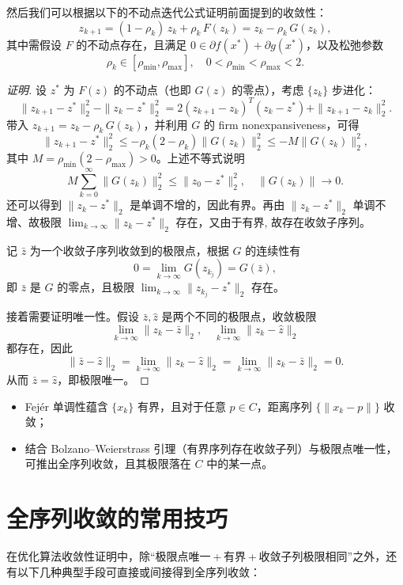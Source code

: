 然后我们可以根据以下的不动点迭代公式证明前面提到的收敛性：
\[
z_{k+1} = (1-\rho_k)\,z_k + \rho_k\,F(z_k)
= z_k - \rho_k\,G(z_k),
\]
其中需假设 $F$ 的不动点存在，且满足 $0\in \partial f(x^*)+\partial g(x^*)$，以及松弛参数
\[
\rho_k\in [\rho_{\min},\rho_{\max}],\quad
0<\rho_{\min}<\rho_{\max}<2.
\]

\begin{proof}[证明]
	设 $z^*$ 为 $F(z)$ 的不动点（也即 $G(z)$ 的零点），考虑 $\{z_k\}$ 步进化：
	\[
	\|z_{k+1}-z^*\|_2^2 - \|z_k-z^*\|_2^2
	= 2(z_{k+1}-z_k)^T(z_k-z^*) + \|z_{k+1}-z_k\|_2^2.
	\]
	带入 $z_{k+1}=z_k-\rho_k\,G(z_k)$，并利用 $G$ 的 firm nonexpansiveness，可得
	\[
	\|z_{k+1}-z^*\|_2^2
	\le -\rho_k(2-\rho_k)\|G(z_k)\|_2^2
	\le -M\|G(z_k)\|_2^2,
	\]
	其中 $M = \rho_{\min}(2-\rho_{\max})>0$。上述不等式说明
	\[
	M\sum_{k=0}^\infty \|G(z_k)\|_2^2 \le \|z_0-z^*\|_2^2,\quad
	\|G(z_k)\|\to 0.
	\]
	还可以得到 $\|z_k - z^*\|_2$ 是单调不增的，因此有界。再由 $\|z_k - z^*\|_2$ 单调不增、故极限 $\lim_{k\to\infty}\|z_k-z^*\|_2$ 存在，又由于有界, 故存在收敛子序列。
	
	记 $\bar z$ 为一个收敛子序列收敛到的极限点，根据 $G$ 的连续性有
	\[
	0 = \lim_{k\to\infty} G(z_{k_j}) = G(\bar z),
	\]
	即 $\bar z$ 是 $G$ 的零点，且极限 $\lim_{k\to\infty}\|z_{k_j}-z^*\|_2$ 存在。
	
	接着需要证明唯一性。假设 $\bar z,\hat z$ 是两个不同的极限点，收敛极限
	\[
	\lim_{k\to\infty}\|z_k-\bar z\|_2,\quad
	\lim_{k\to\infty}\|z_k-\hat z\|_2
	\]
	都存在，因此
	\[
	\|\bar z-\hat z\|_2
	= \lim_{k\to\infty}\|z_k-\hat z\|_2
	= \lim_{k\to\infty}\|z_k-\bar z\|_2 = 0.
	\]
	从而 $\bar z = \hat z$，即极限唯一。
\end{proof}
\begin{shaded}
	\begin{itemize}
		\item Fejér 单调性蕴含 $\{x_k\}$ 有界，且对于任意 $p\in C$，距离序列 $\{\|x_k-p\|\}$ 收敛；  
		\item 结合 Bolzano–Weierstrass 引理（有界序列存在收敛子列）与极限点唯一性，可推出全序列收敛，且其极限落在 $C$ 中的某一点。		
	\end{itemize}
\end{shaded}
\newpage
\section{全序列收敛的常用技巧}

在优化算法收敛性证明中，除“极限点唯一 + 有界 + 收敛子列极限相同”之外，还有以下几种典型手段可直接或间接得到全序列收敛：

